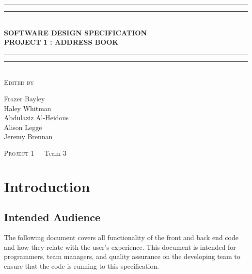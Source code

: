 \documentclass[a4paper, 11pt]{article}
\newlength{\drop}
\begin{document}
	\begin{titlepage}
		\textheight
		\centering
		\vspace*{\baselineskip}
		\rule{\textwidth}{1.6pt}\vspace*{-\baselineskip}\vspace*{2pt}
		\rule{\textwidth}{0.4pt}\\[\baselineskip]
		{\LARGE \textbf{SOFTWARE DESIGN SPECIFICATION \\ PROJECT 1 : ADDRESS BOOK}}\\[0.2\baselineskip]
		\rule{\textwidth}{0.4pt}\vspace*{-\baselineskip}\vspace{3.2pt}
		\rule{\textwidth}{1.6pt}\\[\baselineskip]
		\scshape
		\vspace*{2\baselineskip}
		Edited by \\[\baselineskip]
		{\Large Frazer Bayley \\ Haley Whitman \\ Abdulaziz Al-Heidous \\ Alison Legge \\ Jeremy Brennan\par}

		\vfill
		{\scshape \LARGE Project 1 -} \        {\LARGE Team 3}\par
	\end{titlepage}


\tableofcontents
\vspace*{6\baselineskip}
\begin{versionhistory}

	
\end{versionhistory}
\pagebreak

\section{Introduction}
\subsection{Intended Audience}
The following document covers all functionality of the front and back end code and how they relate with the user's experience. This document is intended for programmers, team managers, and quality assurance on the developing team to ensure that the code is running to this specification.
\end{document}
